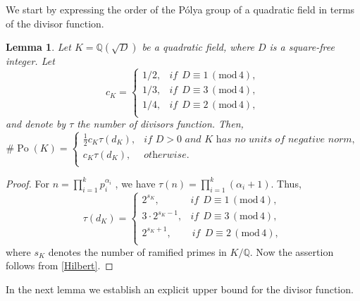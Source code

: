 \documentclass[12pt]{amsart}
\newtheorem{lemma}[theorem]{Lemma}
\theoremstyle{definition}
\numberwithin{equation}{section}
\DeclareMathOperator{\Po}{Po}
\begin{document}
We start by expressing the order of the P\'olya group of a quadratic field in terms of the divisor function. 



\begin{lemma} \label{lemma, order of Po is less than tau imaginary quadratic}
	Let $K=\mathbb{Q}(\sqrt{D})$ be a quadratic field, where
	$D$ is a square-free integer. Let
		\begin{equation*}
		c_K=
		\begin{cases} 
			1/2	, &   \textit{if} ~~   D \equiv 1 \, (\mathrm{mod}\, 4), \\
			1/3,  &   \textit{if} ~~ D \equiv 3 \, (\mathrm{mod}\, 4), \\
			1/4,   &  \textit{if} ~~ D \equiv 2 \, (\mathrm{mod}\, 4),\\
		\end{cases}
	\end{equation*}
	and denote by $\tau$ the number of divisors function. Then,
\begin{equation} \label{equation, Po is alpha times tau}
	\# \Po(K)= \begin{cases} 
	\frac{1}{2}	c_K \tau(d_K), &   \textit{if $D>0$ and $K$ has no units of negative norm}, \\
		c_K \tau(d_K),   &  \textit{otherwise}.\\
		\end{cases}
\end{equation}
\end{lemma}

\begin{proof}
	For  $n =\prod_{i=1}^k p_i^{\alpha_i}$ , we have 
		$\tau\left(n\right)= \prod_{i=1}^k(\alpha_i +1).$
	Thus,	
	\begin{equation*}
		\tau(d_K)=\begin{cases} 
			2^{s_K}, &    \textit{if} ~~ D \equiv 1 \, (\mathrm{mod}\, 4), \\
			3 \cdot 2^{s_K-1}, &    \textit{if} ~~ D \equiv 3 \, (\mathrm{mod}\, 4), \\
			2^{s_K+1}, & \,  \textit{if} ~~ D \equiv 2 \, (\mathrm{mod}\, 4),\\
		\end{cases}
	\end{equation*}
	where $s_K$ denotes the number of ramified primes in $K/\mathbb{Q}$. Now the assertion follows from \eqref{Hilbert}.
	\end{proof}
	
	
In the next lemma we establish an explicit upper bound for the divisor function.
\end{document}
